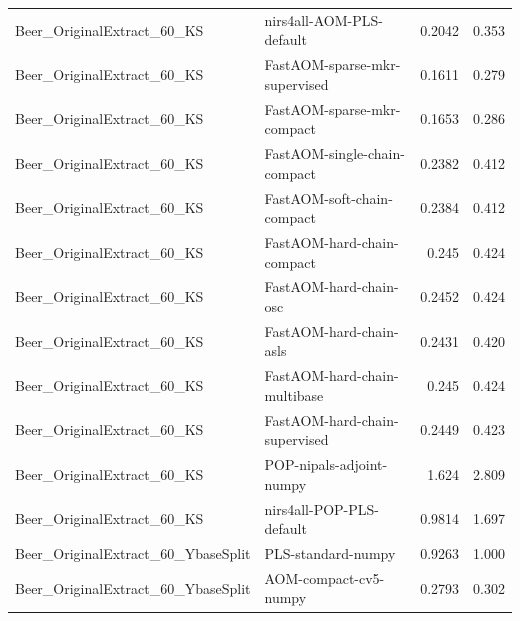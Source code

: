 \begin{landscape}
\begin{longtable}{L{8.0cm}L{9.5cm}rr}
Beer\_\allowbreak{}OriginalExtract\_\allowbreak{}60\_\allowbreak{}KS & nirs4all-\allowbreak{}AOM-\allowbreak{}PLS-\allowbreak{}default & 0.2042 & 0.353 \\
Beer\_\allowbreak{}OriginalExtract\_\allowbreak{}60\_\allowbreak{}KS & FastAOM-\allowbreak{}sparse-\allowbreak{}mkr-\allowbreak{}supervised & 0.1611 & 0.279 \\
Beer\_\allowbreak{}OriginalExtract\_\allowbreak{}60\_\allowbreak{}KS & FastAOM-\allowbreak{}sparse-\allowbreak{}mkr-\allowbreak{}compact & 0.1653 & 0.286 \\
Beer\_\allowbreak{}OriginalExtract\_\allowbreak{}60\_\allowbreak{}KS & FastAOM-\allowbreak{}single-\allowbreak{}chain-\allowbreak{}compact & 0.2382 & 0.412 \\
Beer\_\allowbreak{}OriginalExtract\_\allowbreak{}60\_\allowbreak{}KS & FastAOM-\allowbreak{}soft-\allowbreak{}chain-\allowbreak{}compact & 0.2384 & 0.412 \\
Beer\_\allowbreak{}OriginalExtract\_\allowbreak{}60\_\allowbreak{}KS & FastAOM-\allowbreak{}hard-\allowbreak{}chain-\allowbreak{}compact & 0.245 & 0.424 \\
Beer\_\allowbreak{}OriginalExtract\_\allowbreak{}60\_\allowbreak{}KS & FastAOM-\allowbreak{}hard-\allowbreak{}chain-\allowbreak{}osc & 0.2452 & 0.424 \\
Beer\_\allowbreak{}OriginalExtract\_\allowbreak{}60\_\allowbreak{}KS & FastAOM-\allowbreak{}hard-\allowbreak{}chain-\allowbreak{}asls & 0.2431 & 0.420 \\
Beer\_\allowbreak{}OriginalExtract\_\allowbreak{}60\_\allowbreak{}KS & FastAOM-\allowbreak{}hard-\allowbreak{}chain-\allowbreak{}multibase & 0.245 & 0.424 \\
Beer\_\allowbreak{}OriginalExtract\_\allowbreak{}60\_\allowbreak{}KS & FastAOM-\allowbreak{}hard-\allowbreak{}chain-\allowbreak{}supervised & 0.2449 & 0.423 \\
Beer\_\allowbreak{}OriginalExtract\_\allowbreak{}60\_\allowbreak{}KS & POP-\allowbreak{}nipals-\allowbreak{}adjoint-\allowbreak{}numpy & 1.624 & 2.809 \\
Beer\_\allowbreak{}OriginalExtract\_\allowbreak{}60\_\allowbreak{}KS & nirs4all-\allowbreak{}POP-\allowbreak{}PLS-\allowbreak{}default & 0.9814 & 1.697 \\
Beer\_\allowbreak{}OriginalExtract\_\allowbreak{}60\_\allowbreak{}YbaseSplit & PLS-\allowbreak{}standard-\allowbreak{}numpy & 0.9263 & 1.000 \\
Beer\_\allowbreak{}OriginalExtract\_\allowbreak{}60\_\allowbreak{}YbaseSplit & AOM-\allowbreak{}compact-\allowbreak{}cv5-\allowbreak{}numpy & 0.2793 & 0.302 \\

\end{longtable}
\end{landscape}
